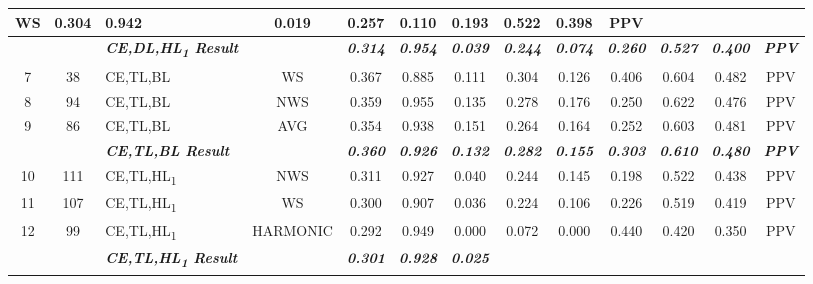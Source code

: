 \begin{table}[H]
{\begin{tabular}{cc|l|c|c|c|c|c|c|c|c|c|c|}
    WS &
    0.304 &
    0.942 &
    0.019 &
    0.257 &
    0.110 &
    0.193 &
    0.522 &
    0.398 &
    PPV \\ \hline
  \textit{\textbf{}} &
    \textit{\textbf{}} &
    \textit{\textbf{CE,DL,HL\textsubscript{1} Result}} &
    \textit{\textbf{}} &
    \textit{\textbf{0.314}} &
    \textit{\textbf{0.954}} &
    \textit{\textbf{0.039}} &
    \textit{\textbf{0.244}} &
    \textit{\textbf{0.074}} &
    \textit{\textbf{0.260}} &
    \textit{\textbf{0.527}} &
    \textit{\textbf{0.400}} &
    \textit{\textbf{PPV}} \\ \hline
  \multicolumn{1}{|c|}{7} &
    38 &
    CE,TL,BL &
    WS &
    0.367 &
    0.885 &
    0.111 &
    0.304 &
    0.126 &
    0.406 &
    0.604 &
    0.482 &
    PPV \\ \hline
  \multicolumn{1}{|c|}{8} &
    94 &
    CE,TL,BL &
    NWS &
    0.359 &
    0.955 &
    0.135 &
    0.278 &
    0.176 &
    0.250 &
    0.622 &
    0.476 &
    PPV \\ \hline
  \multicolumn{1}{|c|}{9} &
    86 &
    CE,TL,BL &
    AVG &
    0.354 &
    0.938 &
    0.151 &
    0.264 &
    0.164 &
    0.252 &
    0.603 &
    0.481 &
    PPV \\ \hline
  \textit{\textbf{}} &
    \textit{\textbf{}} &
    \textit{\textbf{CE,TL,BL Result}} &
    \textit{\textbf{}} &
    \textit{\textbf{0.360}} &
    \textit{\textbf{0.926}} &
    \textit{\textbf{0.132}} &
    \textit{\textbf{0.282}} &
    \textit{\textbf{0.155}} &
    \textit{\textbf{0.303}} &
    \textit{\textbf{0.610}} &
    \textit{\textbf{0.480}} &
    \textit{\textbf{PPV}} \\ \hline
  \multicolumn{1}{|c|}{10} &
    111 &
    CE,TL,HL\textsubscript{1} &
    NWS &
    0.311 &
    0.927 &
    0.040 &
    0.244 &
    0.145 &
    0.198 &
    0.522 &
    0.438 &
    PPV \\ \hline
  \multicolumn{1}{|c|}{11} &
    107 &
    CE,TL,HL\textsubscript{1} &
    WS &
    0.300 &
    0.907 &
    0.036 &
    0.224 &
    0.106 &
    0.226 &
    0.519 &
    0.419 &
    PPV \\ \hline
  \multicolumn{1}{|c|}{12} &
    99 &
    CE,TL,HL\textsubscript{1} &
    HARMONIC &
    0.292 &
    0.949 &
    0.000 &
    0.072 &
    0.000 &
    0.440 &
    0.420 &
    0.350 &
    PPV \\ \hline
  \textit{\textbf{}} &
    \textit{\textbf{}} &
    \textit{\textbf{CE,TL,HL\textsubscript{1} Result}} &
    \textit{\textbf{}} &
    \textit{\textbf{0.301}} &
    \textit{\textbf{0.928}} &
    \textit{\textbf{0.025}} &

\end{tabular}}
\end{table}
